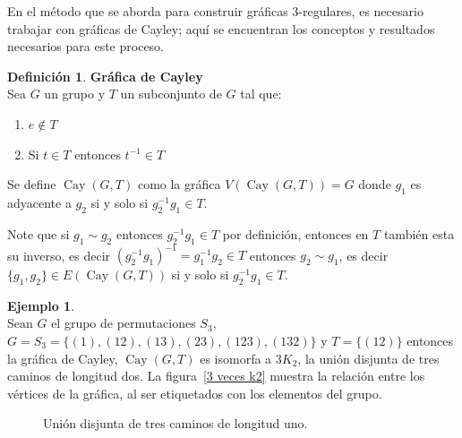 \documentclass[12pt]{book}
\theoremstyle{definition}
\newtheorem{definition}{Definición}
\newtheorem{example}{Ejemplo}
\DeclareMathOperator{\Cay}{Cay}
\begin{document}
En el método que se aborda para construir gráficas 3-regulares, es
necesario trabajar con gráficas de Cayley; aquí se encuentran los
conceptos y resultados necesarios para este proceso.


\begin{definition}\textbf{Gráfica de Cayley}\\
  Sea $G$ un grupo y $T$ un subconjunto de $G$ tal que:
  \begin{enumerate}
  \item $e \notin T $
  \item Si $t\in T$ entonces $t^{-1}\in T$
  \end{enumerate}
  Se define $\Cay(G,T)$ como la gráfica $V(\Cay(G,T))=G$ donde $g_1$
  es adyacente a $g_2$ si y solo si $g_2^{-1}g_1 \in T$.\label{defcay}
\end{definition}

Note que si $g_1 \sim g_2$ entonces $g_2^{-1}g_1 \in T$ por
definición, entonces en $T$ también esta su inverso, es decir
$(g_2^{-1}g_1)^{-1} = g_1^{-1}g_2\in T$ entonces $g_2 \sim g_1$, es
decir $\{g_1,g_2\}\in E(\Cay(G,T))$ si y solo si
$g_2^{-1}g_1 \in T$.

\begin{example}\textbf{}\\
  Sean $G$ el grupo de permutaciones $S_3$, $G=S_3= \{(1),(12),(13),(23),(123),(132)\}$ y $T=\{(12)\}$
  entonces la gráfica de Cayley, $\Cay(G,T)$ es isomorfa a $3K_2$, la unión disjunta de tres caminos de longitud dos. La figura~\ref{3 veces k2} muestra la relación entre los vértices de la gráfica, al ser etiquetados con los elementos del grupo.
\end{example}

\begin{figure}[htb]
  \centering
  \caption{Unión disjunta de tres caminos de longitud uno.} \label{3
    veces k2}
\end{figure}
\end{document}
